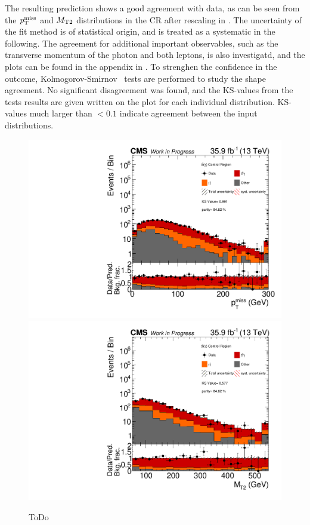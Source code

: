 The resulting prediction shows a good agreement with data, as can be seen from the $p_{\mathrm{T}}^\text{miss}$ and $M_{\mathrm{T2}}$ distributions in the CR after rescaling in . The uncertainty of the fit method is of statistical origin, and is treated as a systematic in the following. The agreement for additional important observables, such as the transverse momentum of the photon and both leptons, is also investigatd, and the plots can be found in the appendix in . To strenghen the confidence in the outcome, Kolmogorov-Smirnov~\cite{KS} tests are performed to study the shape agreement. No significant disagreement was found, and the KS-values from the tests results are given written on the plot for each individual distribution. KS-values much larger than $<0.1$ indicate agreement between the input distributions.\\
\begin{figure}[htb]
 \centering
 \includegraphics[width=\pairwidth]{figures/plots_CR_tt/CRTT_EM_nom_met_log}
 \includegraphics[width=\pairwidth]{figures/plots_CR_tt/CRTT_EM_nom_mt2_log}
 \caption{ToDo}
 \label{fig:CRTT}
\end{figure}
